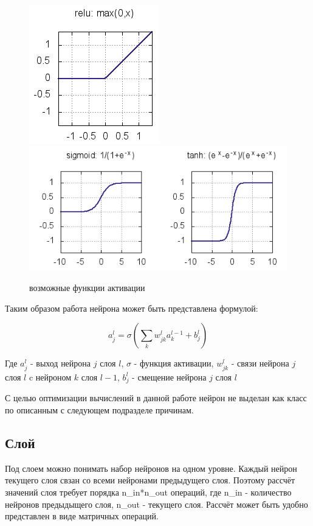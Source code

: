 \documentclass[a4paper,12pt]{article}
\begin{document}
\begin{center}
	\begin{figure}[h]
		\centering
   		\includegraphics[scale=0.7]{img/act_relu.png}
   		\includegraphics[scale=0.7]{img/act_sigm_tanh.png}
   		\caption{возможные функции активации}
   		\label{fig:act_functs}
    \end{figure}
\end{center}

Таким образом работа нейрона может быть представлена формулой:

{\large $$a^{l}_j = \sigma\left( \sum_k w^{l}_{jk} a^{l-1}_k + b^l_j \right)$$}

Где $a^l_j $ - выход нейрона $j$ слоя $l$, $ \sigma $ - функция активации, $w^l_{jk}$ - связи нейрона $j$ слоя $l$ c нейроном $k$ слоя $l-1$, $b^l_j$ - смещение нейрона $j$ слоя $l$

С целью оптимизации вычислений в данной работе нейрон не выделан как класс по описанным с следующем подразделе причинам.

\subsection{Слой}
Под слоем можно понимать набор нейронов на одном уровне. Каждый нейрон текущего слоя свзан со всеми нейронами предыдущего слоя. Поэтому рассчёт значений слоя требует порядка n\_in*n\_out операций, где n\_in - количество нейронов предыдыщего слоя, n\_out - текущего слоя. Рассчёт может быть удобно представлен в виде матричных операций. 
\end{document}
